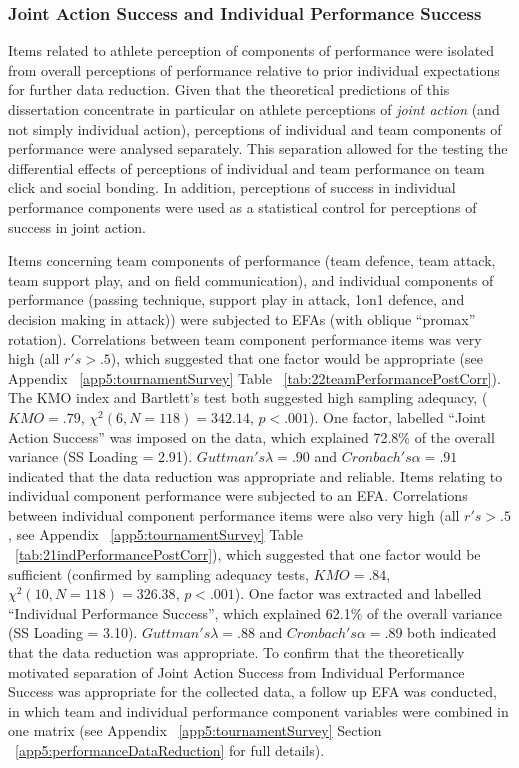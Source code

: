 \subsubsection{Joint Action Success and Individual Performance Success}
Items related to athlete perception of components of performance were isolated from overall perceptions of performance relative to prior individual expectations for further data reduction. Given that the theoretical predictions of this dissertation concentrate in particular on athlete perceptions of \textit{joint action} (and not simply individual action), perceptions of individual and team components of performance were analysed separately. This separation allowed for the testing the differential effects of perceptions of individual and team performance on team click and social bonding. In addition, perceptions of success in individual performance components were used as a statistical control for perceptions of success in joint action.

Items concerning team components of performance (team defence, team attack, team support play, and on field communication), and individual components of performance (passing technique, support play in attack, 1on1 defence, and decision making in attack)) were subjected to EFAs (with oblique ``promax'' rotation).  Correlations between team component performance items was very high (all $r's > .5$), which suggested that one factor would be appropriate (see Appendix ~\ref{app5:tournamentSurvey} Table ~\ref{tab:22teamPerformancePostCorr}). The KMO index and Bartlett's test both suggested high sampling adequacy, ($KMO = .79$, $\chi^2(6, N = 118) = 342.14$, $p < .001$).  One factor, labelled ``Joint Action Success'' was imposed on the data, which explained 72.8\% of the overall variance (SS Loading = 2.91). $Guttman's \lambda =.90$ and $Cronbach's\alpha = .91$ indicated that the data reduction was appropriate and reliable. Items relating to individual component performance  were subjected to an EFA.  Correlations between individual component performance items were also very high (all $r's > .5$, see Appendix ~\ref{app5:tournamentSurvey} Table ~\ref{tab:21indPerformancePostCorr}), which suggested that one factor would be sufficient (confirmed by sampling adequacy tests, $KMO =  .84$, $\chi^2(10, N = 118) =  326.38$, $p < .001$).  One factor was extracted and labelled ``Individual Performance Success'', which explained 62.1\% of the overall variance (SS Loading = 3.10).
$Guttman's\lambda =.88$ and $Cronbach's \alpha = .89$ both indicated that the data reduction was appropriate.  To confirm that the theoretically motivated separation of Joint Action Success from Individual Performance Success was appropriate for the collected data, a follow up EFA was conducted, in which team and individual performance component variables were combined in one matrix (see Appendix ~\ref{app5:tournamentSurvey} Section ~\ref{app5:performanceDataReduction} for full details).


